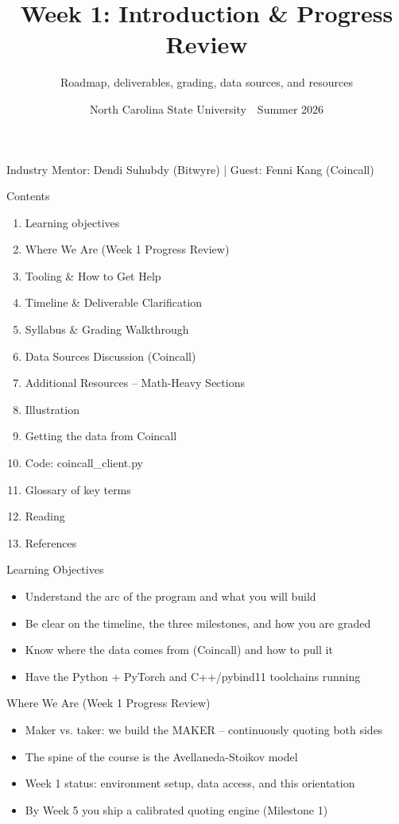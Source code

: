 \documentclass[aspectratio=169,10pt]{beamer}
\title{Week 1: Introduction \& Progress Review}
\subtitle{Roadmap, deliverables, grading, data sources, and resources}
\date{North Carolina State University \,\textbar\, Summer 2026}
\begin{document}
\begin{frame}[plain]\titlepage\begin{center}\tiny Industry Mentor: Dendi Suhubdy (Bitwyre)  |  Guest: Fenni Kang (Coincall)\end{center}\end{frame}
\begin{frame}{Contents}
\small\begin{enumerate}\setlength{\itemsep}{3pt}
  \item Learning objectives
  \item Where We Are (Week 1 Progress Review)
  \item Tooling \& How to Get Help
  \item Timeline \& Deliverable Clarification
  \item Syllabus \& Grading Walkthrough
  \item Data Sources Discussion (Coincall)
  \item Additional Resources -- Math-Heavy Sections
  \item Illustration
  \item Getting the data from Coincall
  \item Code: coincall\_client.py
  \item Glossary of key terms
  \item Reading
  \item References
\end{enumerate}
\end{frame}

\begin{frame}{Learning Objectives}
\begin{itemize}
  \item Understand the arc of the program and what you will build
  \item Be clear on the timeline, the three milestones, and how you are graded
  \item Know where the data comes from (Coincall) and how to pull it
  \item Have the Python + PyTorch and C++/pybind11 toolchains running
\end{itemize}
\end{frame}

\begin{frame}{Where We Are (Week 1 Progress Review)}
\begin{itemize}
  \item Maker vs. taker: we build the MAKER -- continuously quoting both sides
  \item The spine of the course is the Avellaneda-Stoikov model
  \item Week 1 status: environment setup, data access, and this orientation
  \item By Week 5 you ship a calibrated quoting engine (Milestone 1)
\end{itemize}
\end{frame}
\end{document}

